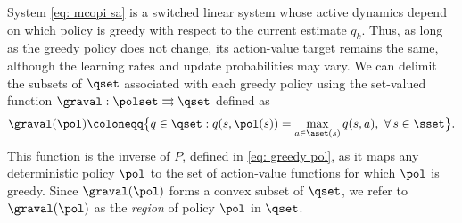 System \eqref{eq: mcopi sa} is a switched linear system whose active dynamics depend on which policy is greedy with respect to the current estimate $q_k$.
Thus, as long as the greedy policy does not change, its action-value target remains the same, although the learning rates and update probabilities may vary.
% 
We can delimit the subsets of $\qset$ associated with each greedy policy using the set-valued function $\graval : \polset \rightrightarrows \qset$ defined as
\begin{align}
\label{eq: greedy action values}
    \graval(\pol) \coloneqq \big\{ q \in \qset : q(s, \pol(s)) = \max_{a \in \aset(s)} q(s,a), \ \forall \, s \in \sset \big\} .
\end{align}
This function is the inverse of $P$, defined in \eqref{eq: greedy pol}, as it maps any deterministic policy $\pol$ to the set of action-value functions for which $\pol$ is greedy.
Since $\graval(\pol)$ forms a convex subset of $\qset$, we refer to $\graval(\pol)$ as the \textit{region} of policy $\pol$ in $\qset$.




